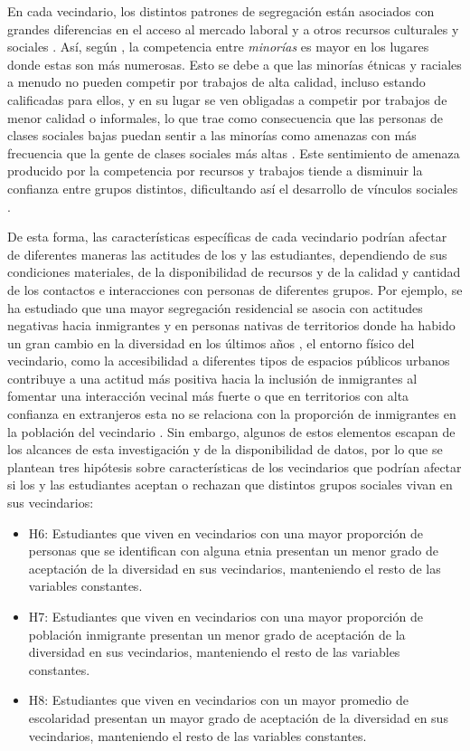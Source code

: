 \documentclass[12pt,twoside]{templates/facsothesis}
\begin{document}
En cada vecindario, los distintos patrones de segregación están asociados con grandes diferencias en el acceso al mercado laboral y a otros recursos culturales y sociales \citep{fernandez_breaking_2016}. Así, según \citet{baldassarri_diversity_2020}, la competencia entre \emph{minorías} es mayor en los lugares donde estas son más numerosas. Esto se debe a que las minorías étnicas y raciales a menudo no pueden competir por trabajos de alta calidad, incluso estando calificadas para ellos, y en su lugar se ven obligadas a competir por trabajos de menor calidad o informales, lo que trae como consecuencia que las personas de clases sociales bajas puedan sentir a las minorías como amenazas con más frecuencia que la gente de clases sociales más altas \citep{baldassarri_diversity_2020}. Este sentimiento de amenaza producido por la competencia por recursos y trabajos tiende a disminuir la confianza entre grupos distintos, dificultando así el desarrollo de vínculos sociales \citep{cote_untangling_2009}.

De esta forma, las características específicas de cada vecindario podrían afectar de diferentes maneras las actitudes de los y las estudiantes, dependiendo de sus condiciones materiales, de la disponibilidad de recursos y de la calidad y cantidad de los contactos e interacciones con personas de diferentes grupos. Por ejemplo, se ha estudiado que una mayor segregación residencial se asocia con actitudes negativas hacia inmigrantes y en personas nativas de territorios donde ha habido un gran cambio en la diversidad en los últimos años \citep{kawalerowicz_too_2021}, el entorno físico del vecindario, como la accesibilidad a diferentes tipos de espacios públicos urbanos contribuye a una actitud más positiva hacia la inclusión de inmigrantes al fomentar una interacción vecinal más fuerte \citep{wang_neighborhood_2022} o que en territorios con alta confianza en extranjeros esta no se relaciona con la proporción de inmigrantes en la población del vecindario \citep{schonwalder_attitudes_2016}. Sin embargo, algunos de estos elementos escapan de los alcances de esta investigación y de la disponibilidad de datos, por lo que se plantean tres hipótesis sobre características de los vecindarios que podrían afectar si los y las estudiantes aceptan o rechazan que distintos grupos sociales vivan en sus vecindarios:

\begin{itemize}
\item
  H6: Estudiantes que viven en vecindarios con una mayor proporción de personas que se identifican con alguna etnia presentan un menor grado de aceptación de la diversidad en sus vecindarios, manteniendo el resto de las variables constantes.
\item
  H7: Estudiantes que viven en vecindarios con una mayor proporción de población inmigrante presentan un menor grado de aceptación de la diversidad en sus vecindarios, manteniendo el resto de las variables constantes.
\item
  H8: Estudiantes que viven en vecindarios con un mayor promedio de escolaridad presentan un mayor grado de aceptación de la diversidad en sus vecindarios, manteniendo el resto de las variables constantes.
\end{itemize}
\end{document}
